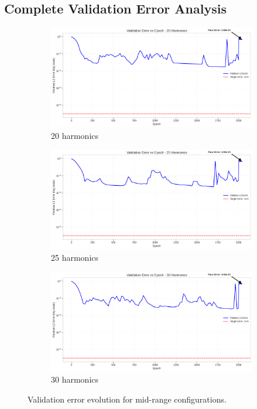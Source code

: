 \subsection{Complete Validation Error Analysis}

\begin{figure}[H]
    \centering
    \begin{subfigure}[b]{0.32\textwidth}
        \centering
        \includegraphics[width=\textwidth]{figures/validation_error_20h.png}
        \caption{20 harmonics}
    \end{subfigure}
    \hfill
    \begin{subfigure}[b]{0.32\textwidth}
        \centering
        \includegraphics[width=\textwidth]{figures/validation_error_25h.png}
        \caption{25 harmonics}
    \end{subfigure}
    \hfill
    \begin{subfigure}[b]{0.32\textwidth}
        \centering
        \includegraphics[width=\textwidth]{figures/validation_error_30h.png}
        \caption{30 harmonics}
    \end{subfigure}
    \caption{Validation error evolution for mid-range configurations.}
    \label{fig:validation_mid}
\end{figure}

